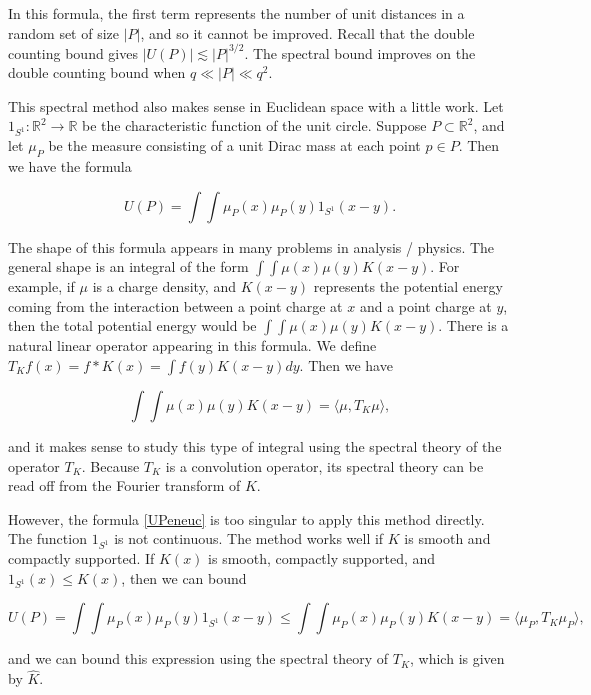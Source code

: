 \documentclass{amsart}
\newcommand{\RR}{\mathbb{R}}
\begin{document}
In this formula, the first term represents the number of unit distances in a random set of size $|P|$, and so it cannot be improved.  Recall that the double counting bound gives $|U(P)| \lesssim |P|^{3/2}$.  The spectral bound improves on the double counting bound when $q \ll |P| \ll q^2$.  

This spectral method also makes sense in Euclidean space with a little work.  Let $1_{S^1}: \RR^2 \rightarrow \RR$ be the characteristic function of the unit circle.   Suppose $P \subset \RR^2$, and let $\mu_P$ be the measure consisting of a unit Dirac mass at each point $p \in P$.  Then we have the formula

\begin{equation} \label{UPeneuc}
 U(P) = \int \int \mu_P(x) \mu_P(y) 1_{S^1}(x-y). 
 \end{equation}

The shape of this formula appears in many problems in analysis / physics.   The general shape is an integral of the form $\int \int \mu(x) \mu(y) K(x-y)$.   For example,  if $\mu$ is a charge density,  and $K(x-y)$ represents the potential energy coming from the interaction between a point charge at $x$ and a point charge at $y$,  then the total potential energy would be $\int \int \mu(x) \mu(y) K(x-y)$.    There is a natural linear operator appearing in this formula.  We define $T_K f(x) = f * K (x) = \int f(y) K(x-y) dy$.  Then we have 

$$ \int \int \mu(x) \mu(y) K(x-y) = \langle \mu, T_K \mu \rangle, $$

\noindent and it makes sense to study this type of integral using the spectral theory of the operator $T_K$.  Because $T_K$ is a convolution operator, its spectral theory can be read off from the Fourier transform of $K$.

However, the formula \eqref{UPeneuc} is too singular to apply this method directly.  The function $1_{S^1}$ is not continuous. The method works well if $K$ is smooth and compactly supported.  If $K (x)$ is smooth, compactly supported, and $1_{S^1}(x) \le K(x)$, then we can bound 

\begin{equation} \label{UPeneuc2}
 U(P) = \int \int \mu_P(x) \mu_P(y) 1_{S^1}(x-y) \le \int \int \mu_P(x) \mu_P(y) K(x-y) = \langle \mu_P, T_K \mu_P \rangle, 
 \end{equation}

\noindent and we can bound this expression using the spectral theory of $T_K$, which is given by $\hat K$.  
\end{document}
